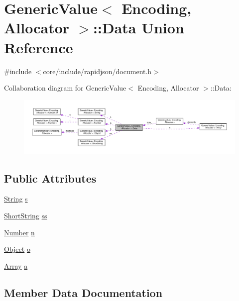 \hypertarget{unionGenericValue_1_1Data}{}\section{Generic\+Value$<$ Encoding, Allocator $>$\+:\+:Data Union Reference}
\label{unionGenericValue_1_1Data}


{\ttfamily \#include $<$core/include/rapidjson/document.\+h$>$}



Collaboration diagram for Generic\+Value$<$ Encoding, Allocator $>$\+:\+:Data\+:
\nopagebreak
\begin{figure}[H]
\begin{center}
\leavevmode
\includegraphics[width=350pt]{unionGenericValue_1_1Data__coll__graph}
\end{center}
\end{figure}
\subsection*{Public Attributes}
\begin{DoxyCompactItemize}
\item 
\hyperlink{structGenericValue_1_1String}{String} \hyperlink{unionGenericValue_1_1Data_a6872a4b93763944063b425e6c001ed2b}{s}
\item 
\hyperlink{structGenericValue_1_1ShortString}{Short\+String} \hyperlink{unionGenericValue_1_1Data_a410e39a5dc296eb3b152b54193740e4c}{ss}
\item 
\hyperlink{unionGenericValue_1_1Number}{Number} \hyperlink{unionGenericValue_1_1Data_a243007cce2f4b75bea3e3c1ee4c3c239}{n}
\item 
\hyperlink{structGenericValue_1_1Object}{Object} \hyperlink{unionGenericValue_1_1Data_a15c6847aa3272560aaff5e7ed4320a7f}{o}
\item 
\hyperlink{structGenericValue_1_1Array}{Array} \hyperlink{unionGenericValue_1_1Data_a1935b99b33ec9deff9f6360f8fa7b812}{a}
\end{DoxyCompactItemize}


\subsection{Member Data Documentation}
